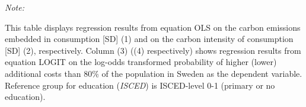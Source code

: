 \begin{table}[htbp!]
\begin{adjustbox}{width = 1\textwidth, max height = 0.95\textheight, center}
\begin{threeparttable}[b]
         \begin{tablenotes}\item \medskip \textit{Note:}
            \item This table displays regression results from equation OLS on the carbon emissions embedded in consumption [SD] (1) and on the carbon intensity of consumption [SD] (2), respectively. 
                                      Column (3) ((4) respectively) shows regression results from equation LOGIT on the log-odds transformed probability of higher (lower) additional costs than 80\% of the population in Sweden as the dependent variable. Reference group for education (\textit{ISCED}) is ISCED-level 0-1 (primary or no education).
         \end{tablenotes}
      \end{threeparttable}
   \end{adjustbox}
\end{table}


